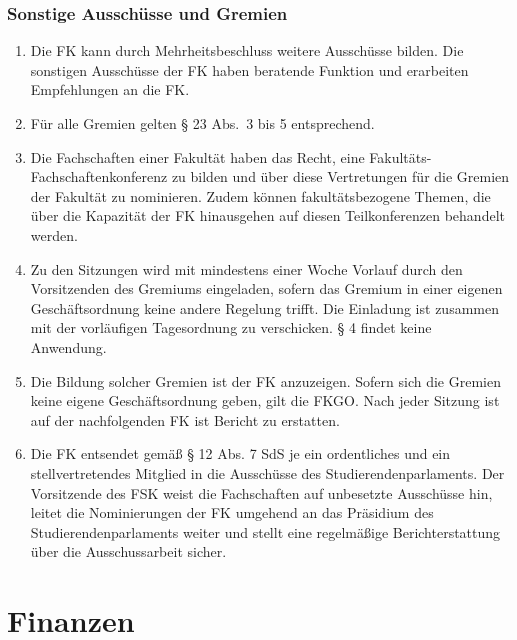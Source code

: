 \documentclass{article}
\begin{document}
\section{Sonstige Ausschüsse und Gremien}
\begin{enumerate}[(1)]
    \item Die FK kann durch Mehrheitsbeschluss weitere Ausschüsse bilden. 
    	Die sonstigen Ausschüsse der FK haben beratende Funktion und erarbeiten Empfehlungen an die FK. 
    \item Für alle Gremien gelten § 23 Abs.\ 3 bis 5 entsprechend.
    \item Die Fachschaften einer Fakultät haben das Recht, eine Fakultäts-Fachschaftenkonferenz zu bilden und über diese Vertretungen für die Gremien der Fakultät zu nominieren.
    	Zudem können fakultätsbezogene Themen, die über die Kapazität der FK hinausgehen auf diesen Teilkonferenzen behandelt werden.
    \item Zu den Sitzungen wird mit mindestens einer Woche Vorlauf durch den Vorsitzenden des Gremiums eingeladen, sofern das Gremium in einer eigenen Geschäftsordnung keine andere Regelung trifft. 
    	Die Einladung ist zusammen mit der vorläufigen Tagesordnung zu verschicken. 
    	§ 4 findet keine Anwendung.
    \item Die Bildung solcher Gremien ist der FK anzuzeigen. 
    	Sofern sich die Gremien keine eigene Geschäftsordnung geben, gilt die FKGO. 
    	Nach jeder Sitzung ist auf der nachfolgenden FK ist Bericht zu erstatten.
    \item Die FK entsendet gemäß § 12 Abs. 7 SdS je ein ordentliches und ein stellvertretendes Mitglied in die Ausschüsse des Studierendenparlaments. 
    	Der Vorsitzende des FSK weist die Fachschaften auf unbesetzte Ausschüsse hin, leitet die Nominierungen der FK umgehend an das Präsidium des Studierendenparlaments weiter und stellt eine regelmäßige Berichterstattung über die Ausschussarbeit sicher.
\end{enumerate}

\part{Finanzen}
\end{document}
